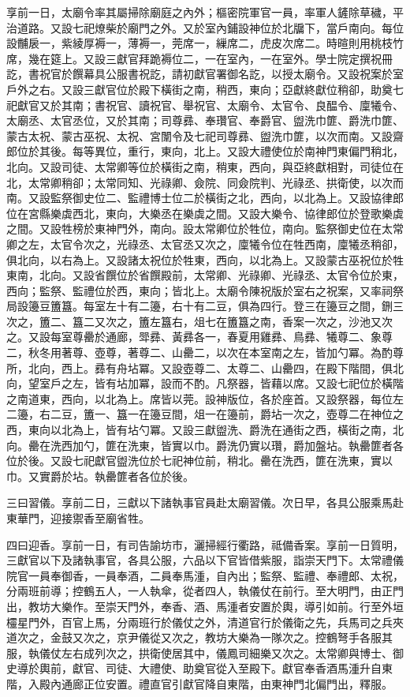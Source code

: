 \begin{pinyinscope}
 享前一日，太廟令率其屬掃除廟庭之內外；樞密院軍官一員，率軍人鏟除草穢，平治道路。又設七祀燎柴於廟門之外。又於室內鋪設神位於北牖下，當戶南向。每位設黼扆一，紫綾厚褥一，薄褥一，莞席一，繅席二，虎皮次席二。時暄則用桃枝竹席，幾在筵上。又設三獻官拜跪褥位二，一在室內，一在室外。學士院定撰祝冊訖，書祝官於饌幕具公服書祝訖，請初獻官署御名訖，以授太廟令。又設祝案於室戶外之右。又設三獻官位於殿下橫街之南，稍西，東向；亞獻終獻位稍卻，助奠七祀獻官又於其南；書祝官、讀祝官、舉祝官、太廟令、太官令、良醖令、廩犧令、太廟丞、太官丞位，又於其南；司尊彞、奉瓚官、奉爵官、盥洗巾篚、爵洗巾篚、蒙古太祝、蒙古巫祝、太祝、宮闈令及七祀司尊彞、盥洗巾篚，以次而南。又設齋郎位於其後。每等異位，重行，東向，北上。又設大禮使位於南神門東偏門稍北，北向。又設司徒、太常卿等位於橫街之南，稍東，西向，與亞終獻相對，司徒位在北，太常卿稍卻；太常同知、光祿卿、僉院、同僉院判、光祿丞、拱衛使，以次而南。又設監祭御史位二、監禮博士位二於橫街之北，西向，以北為上。又設協律郎位在宮縣樂虡西北，東向，大樂丞在樂虡之間。又設大樂令、協律郎位於登歌樂虡之間。又設牲榜於東神門外，南向。設太常卿位於牲位，南向。監祭御史位在太常卿之左，太官令次之，光祿丞、太官丞又次之，廩犧令位在牲西南，廩犧丞稍卻，俱北向，以右為上。又設諸太祝位於牲東，西向，以北為上。又設蒙古巫祝位於牲東南，北向。又設省饌位於省饌殿前，太常卿、光祿卿、光祿丞、太官令位於東，西向；監祭、監禮位於西，東向；皆北上。太廟令陳祝版於室右之祝案，又率祠祭局設籩豆簠簋。每室左十有二籩，右十有二豆，俱為四行。登三在籩豆之間，鉶三次之，簠二、簋二又次之，簠左簋右，俎七在簠簋之南，香案一次之，沙池又次之。又設每室尊罍於通廊，斝彞、黃彞各一，春夏用雞彞、鳥彞、犧尊二、象尊二，秋冬用著尊、壺尊，著尊二、山罍二，以次在本室南之左，皆加勺冪。為酌尊所，北向，西上。彞有舟坫冪。又設壺尊二、太尊二、山罍四，在殿下階間，俱北向，望室戶之左，皆有坫加冪，設而不酌。凡祭器，皆藉以席。又設七祀位於橫階之南道東，西向，以北為上。席皆以莞。設神版位，各於座首。又設祭器，每位左二籩，右二豆，簠一、簋一在籩豆間，俎一在籩前，爵坫一次之，壺尊二在神位之西，東向以北為上，皆有坫勺冪。又設三獻盥洗、爵洗在通街之西，橫街之南，北向。罍在洗西加勺，篚在洗東，皆實以巾。爵洗仍實以瓚，爵加盤坫。執罍篚者各位於後。又設七祀獻官盥洗位於七祀神位前，稍北。罍在洗西，篚在洗東，實以巾。又實爵於坫。執罍篚者各位於後。



 三曰習儀。享前二日，三獻以下諸執事官員赴太廟習儀。次日早，各具公服乘馬赴東華門，迎接禦香至廟省牲。



 四曰迎香。享前一日，有司告諭坊市，灑掃經行衢路，祗備香案。享前一日質明，三獻官以下及諸執事官，各具公服，六品以下官皆借紫服，詣崇天門下。太常禮儀院官一員奉御香，一員奉酒，二員奉馬湩，自內出；監祭、監禮、奉禮郎、太祝，分兩班前導；控鶴五人，一人執傘，從者四人，執儀仗在前行。至大明門，由正門出，教坊大樂作。至崇天門外，奉香、酒、馬湩者安置於輿，導引如前。行至外垣欞星門外，百官上馬，分兩班行於儀仗之外，清道官行於儀衛之先，兵馬司之兵夾道次之，金鼓又次之，京尹儀從又次之，教坊大樂為一隊次之。控鶴弩手各服其服，執儀仗左右成列次之，拱衛使居其中，儀鳳司細樂又次之。太常卿與博士、御史導於輿前，獻官、司徒、大禮使、助奠官從入至殿下。獻官奉香酒馬湩升自東階，入殿內通廊正位安置。禮直官引獻官降自東階，由東神門北偏門出，釋服。




\end{pinyinscope}
